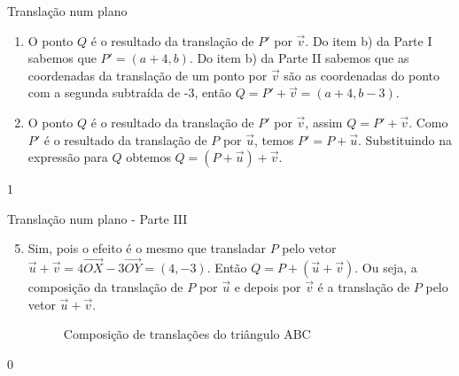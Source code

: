 \begin{answer}{Translação num plano}
{\begin{enumerate}
\item {} 
O ponto \(Q\) é o resultado da translação de \(P'\) por \(\vec{v}\). Do item b) da Parte I sabemos que \(P' = (a + 4,b)\). Do item b) da Parte II sabemos que as coordenadas da translação de um ponto por \(\vec{v}\) são as coordenadas do ponto com a segunda subtraída de -3, então \(Q = P' + \vec{v} = (a+4,b-3)\).

\item {} 
O ponto \(Q\) é o resultado da translação de \(P'\) por \(\vec{v}\), assim \(Q = P' + \vec{v}\). Como \(P'\) é o resultado da translação de \(P\) por \(\vec{u}\), temos \(P'=P + \vec{u}\). Substituindo na expressão para \(Q\) obtemos \(Q= (P+\vec{u}) + \vec{v}\).


\end{enumerate}
}{1}
\end{answer}
\begin{answer}{Translação num plano - Parte III}
{
\begin{enumerate}\setcounter{enumi}{4}
\item {} 
Sim, pois o efeito é o mesmo que transladar \(P\) pelo vetor \(\vec{u} + \vec{v} = 4\overrightarrow{OX} - 3 \overrightarrow{OY} = (4,-3)\). Então \(Q=P+(\vec{u}+\vec{v})\). Ou seja, a composição da translação de \(P\) por \(\vec{u}\) e depois por \(\vec{v}\) é a translação de \(P\) pelo vetor \(\vec{u}+\vec{v}\).

\begin{figure}[H]
\centering

\caption{Composição de translações do triângulo ABC}
\end{figure}
\end{enumerate}
}{0}
\end{answer}
